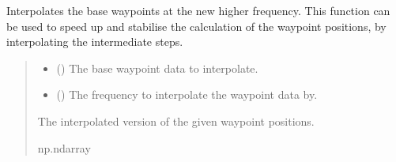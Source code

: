\documentclass[letterpaper,10pt,english]{sphinxmanual}
\begin{document}
\begin{fulllineitems}
\label{\detokenize{modules/waypoints/generation:qnav.waypoints.generation.interpolate_positions}}
\pysigstartsignatures
{}
\pysigstopsignatures
\sphinxAtStartPar
Interpolates the base waypoints at the new higher frequency.
This function can be used to speed up and stabilise the calculation of
the waypoint positions, by interpolating the intermediate steps.
\begin{quote}\begin{description}
\begin{itemize}
\item {} 
\sphinxAtStartPar
{} () \textendash{} The base waypoint data to interpolate.

\item {} 
\sphinxAtStartPar
{} () \textendash{} The frequency to interpolate the waypoint data by.

\end{itemize}

\sphinxAtStartPar
The interpolated version of the given waypoint positions.

\sphinxAtStartPar
np.ndarray

\end{description}\end{quote}

\end{fulllineitems}

\end{document}
